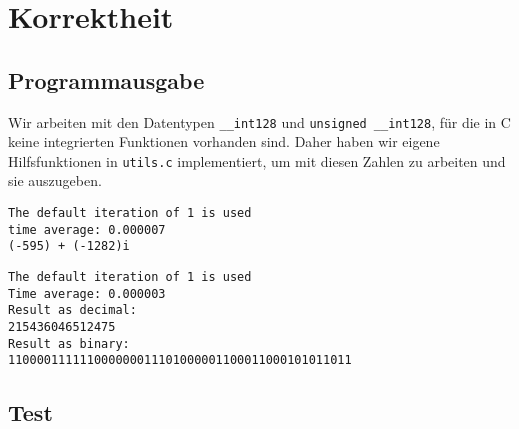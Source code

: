 \documentclass[course=erap]{aspdoc}
\begin{document}
\section{Korrektheit}
\subsection{Programmausgabe}
Wir arbeiten mit den Datentypen \texttt{\_\_int128} und \texttt{unsigned \_\_int128}, für die in C keine integrierten Funktionen vorhanden sind. Daher haben wir eigene Hilfsfunktionen in \texttt{utils.c} implementiert, um mit diesen Zahlen zu arbeiten und sie auszugeben. \cite{Int128}
\begin{lstlisting}[caption={Ausgabe mit Command ./cbns -V 0 -B 123456789. Implementierung v0 wird hierbei verwendet und benchmark ist aktiviert mit 1 Iteration.}, keywords={}]
The default iteration of 1 is used
time average: 0.000007
(-595) + (-1282)i
\end{lstlisting}
\vspace{10pt}
\begin{lstlisting}[caption={Ausgabe mit Command ./cbns -V 1 -B -8917234,786123. Implementierung v1 wird hierbei verwendet und benchmark ist aktiviert mit 1 Iteration.}, keywords={}]
The default iteration of 1 is used
Time average: 0.000003
Result as decimal: 
215436046512475
Result as binary: 
110000111111000000011101000001100011000101011011
\end{lstlisting}
\subsection{Test}
\end{document}
